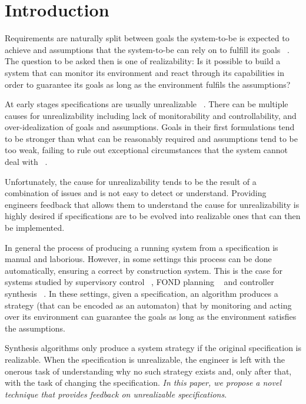 \section{Introduction}


Requirements are naturally split between goals the system-to-be is expected to achieve and
assumptions that the system-to-be can rely on to fulfill its goals ~\cite{Jackson:1995,Letier:2002}. The question to be asked then is one of realizability: Is it possible to build a system that can monitor its environment and react through its capabilities in order to guarantee its goals as long as the environment fulfils the assumptions?

At early stages specifications are usually unrealizable ~\cite{Letier:2002}. There can be multiple causes for unrealizability including lack of monitorability and controllability, and over-idealization of goals and assumptions. Goals in their first formulations tend to be stronger than what can be reasonably required and assumptions tend to be too weak, failing to rule out exceptional circumstances that the system cannot deal with ~\cite{vanLamsweerde:2000}. 

Unfortunately, the cause for unrealizability tends to be the result of a combination of issues and is not easy to detect or understand. Providing engineers feedback that allows them to understand the cause for unrealizability is highly desired if specifications are to be evolved into realizable ones that can then be implemented. 

In general the process of producing a running system from a specification is manual and laborious. However, in some settings this process can be done automatically, ensuring a correct by construction system. This is the case for systems studied by supervisory control ~\cite{ramadge:1989}, FOND planning ~\cite{daniele:2000} and controller synthesis ~\cite{Maoz:2014,Bloem:2012}. 
In these settings, given a specification, an algorithm produces a strategy (that can be encoded as an automaton) that by monitoring and acting over its environment can guarantee the goals as long as the environment satisfies the assumptions. 

Synthesis algorithms only produce a system strategy if the original specification is realizable. 
When the specification is unrealizable, the engineer is left with the onerous task of understanding why no such strategy exists and, only after that, with the task of changing the specification.
\emph{In this paper, we propose a novel technique that provides feedback on unrealizable specifications}. 

